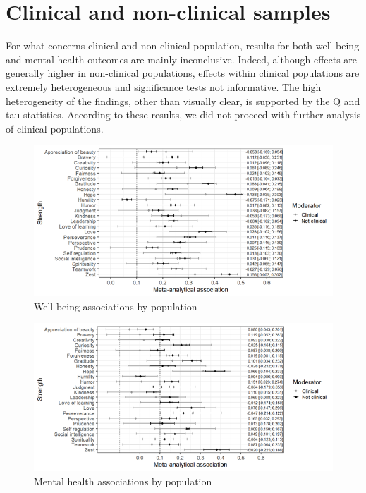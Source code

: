 \documentclass[
  man,floatsintext]{apa6}
\begin{document}
\newpage

\hypertarget{clinical-and-non-clinical-samples}{%
\section{Clinical and non-clinical samples}\label{clinical-and-non-clinical-samples}}

For what concerns clinical and non-clinical population, results for both well-being and mental health outcomes are mainly inconclusive. Indeed, although effects are generally higher in non-clinical populations, effects within clinical populations are extremely heterogeneous and significance tests not informative. The high heterogeneity of the findings, other than visually clear, is supported by the Q and tau statistics. According to these results, we did not proceed with further analysis of clinical populations.

\begin{figure}
\centering
\includegraphics{Figures/WB.png}
\caption{Well-being associations by population}
\end{figure}

\begin{figure}
\centering
\includegraphics{Figures/MH.png}
\caption{Mental health associations by population}
\end{figure}
\end{document}
